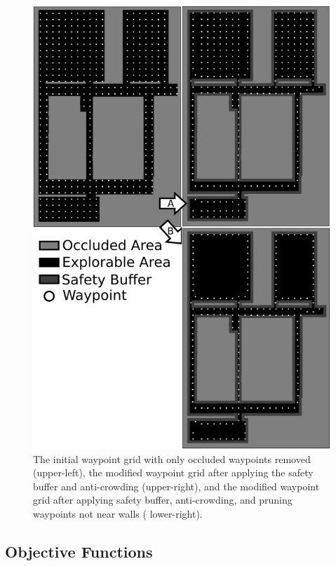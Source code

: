 \documentclass[letterpaper, 10 pt, conference]{ieeeconf}  %
\begin{document}
\begin{figure}
\centering
\includegraphics[width=1.0\linewidth]{waypoint3.png}
\caption[An example of the waypoint pruning process for the coverage planner.]{The initial waypoint grid with only occluded waypoints removed (upper-left), the modified waypoint grid after applying the safety buffer and anti-crowding (upper-right), and the modified waypoint grid after applying safety buffer, anti-crowding, and pruning waypoints not near walls ( lower-right).}
\label{fig:waypoints}
\end{figure}

\subsection{Objective Functions}
\end{document}
